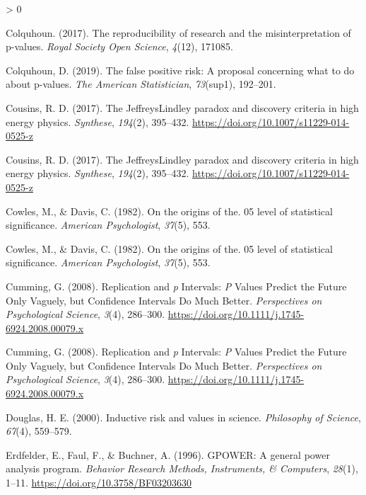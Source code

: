 \documentclass[
  english,
  ,jou, a4paper,floatsintext]{apa6}
\newlength{\cslhangindent}
\newenvironment{CSLReferences}[2] %
 {%
  \setlength{\parindent}{0pt}
  \ifodd #1 \everypar{\setlength{\hangindent}{\cslhangindent}}\ignorespaces\fi
  \ifnum #2 > 0
  \setlength{\parskip}{#2\baselineskip}
  \fi
 }%
 {}
\begin{document}
\begin{CSLReferences}{1}{0}
\leavevmode\hypertarget{ref-colquhoun2017reproducibility}{}%
Colquhoun. (2017). The reproducibility of research and the misinterpretation of p-values. \emph{Royal Society Open Science}, \emph{4}(12), 171085.

\leavevmode\hypertarget{ref-colquhoun2019false}{}%
Colquhoun, D. (2019). The false positive risk: A proposal concerning what to do about p-values. \emph{The American Statistician}, \emph{73}(sup1), 192--201.

\leavevmode\hypertarget{ref-cousins_jeffreyslindley_2017}{}%
Cousins, R. D. (2017). The {Jeffreys}{{Lindley}} paradox and discovery criteria in high energy physics. \emph{Synthese}, \emph{194}(2), 395--432. \url{https://doi.org/10.1007/s11229-014-0525-z}

\leavevmode\hypertarget{ref-cousins_jeffreyslindley_2017}{}%
Cousins, R. D. (2017). The {Jeffreys}{{Lindley}} paradox and discovery criteria in high energy physics. \emph{Synthese}, \emph{194}(2), 395--432. \url{https://doi.org/10.1007/s11229-014-0525-z}

\leavevmode\hypertarget{ref-cowles_origins_1982}{}%
Cowles, M., \& Davis, C. (1982). On the origins of the. 05 level of statistical significance. \emph{American Psychologist}, \emph{37}(5), 553.

\leavevmode\hypertarget{ref-cowles_origins_1982}{}%
Cowles, M., \& Davis, C. (1982). On the origins of the. 05 level of statistical significance. \emph{American Psychologist}, \emph{37}(5), 553.

\leavevmode\hypertarget{ref-cumming_replication_2008}{}%
Cumming, G. (2008). Replication and {\emph{p}} {Intervals}: {\emph{P}} {Values Predict} the {Future Only Vaguely}, but {Confidence Intervals Do Much Better}. \emph{Perspectives on Psychological Science}, \emph{3}(4), 286--300. \url{https://doi.org/10.1111/j.1745-6924.2008.00079.x}

\leavevmode\hypertarget{ref-cumming_replication_2008}{}%
Cumming, G. (2008). Replication and {\emph{p}} {Intervals}: {\emph{P}} {Values Predict} the {Future Only Vaguely}, but {Confidence Intervals Do Much Better}. \emph{Perspectives on Psychological Science}, \emph{3}(4), 286--300. \url{https://doi.org/10.1111/j.1745-6924.2008.00079.x}

\leavevmode\hypertarget{ref-douglas_inductive_2000}{}%
Douglas, H. E. (2000). Inductive risk and values in science. \emph{Philosophy of Science}, \emph{67}(4), 559--579.

\leavevmode\hypertarget{ref-erdfelder_gpower_1996}{}%
Erdfelder, E., Faul, F., \& Buchner, A. (1996). {GPOWER}: {A} general power analysis program. \emph{Behavior Research Methods, Instruments, \& Computers}, \emph{28}(1), 1--11. \url{https://doi.org/10.3758/BF03203630}


\end{CSLReferences}
\end{document}

